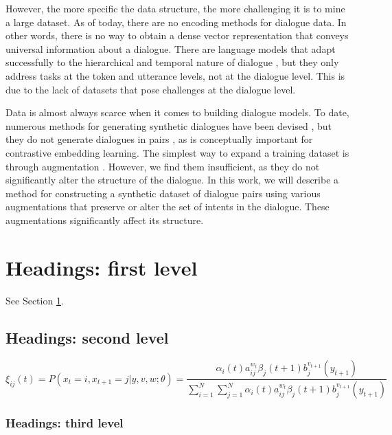 \documentclass{article}
\begin{document}
However, the more specific the data structure, the more challenging it is to mine a large dataset. As of today, there are no encoding methods for dialogue data. In other words, there is no way to obtain a dense vector representation that conveys universal information about a dialogue. There are language models that adapt successfully to the hierarchical and temporal nature of dialogue \cite{zhang-etal-2023-dialog, li2022future}, but they only address tasks at the token and utterance levels, not at the dialogue level. This is due to the lack of datasets that pose challenges at the dialogue level.

Data is almost always scarce when it comes to building dialogue models. To date, numerous methods for generating synthetic dialogues have been devised \cite{kim2021neuralwoz, mohapatra2021simulated, wan-etal-2022-unified, zheng2023augesc}, but they do not generate dialogues in pairs \cite{schick2021generating}, as is conceptually important for contrastive embedding learning. The simplest way to expand a training dataset is through augmentation \cite{soudani2023data}. However, we find them insufficient, as they do not significantly alter the structure of the dialogue. In this work, we will describe a method for constructing a synthetic dataset of dialogue pairs using various augmentations that preserve or alter the set of intents in the dialogue. These augmentations significantly affect its structure.


\section{Headings: first level}
\label{sec:headings}

\lipsum[4] See Section \ref{sec:headings}.

\subsection{Headings: second level}
\lipsum[5]
\begin{equation}
\xi _{ij}(t)=P(x_{t}=i,x_{t+1}=j|y,v,w;\theta)= {\frac {\alpha _{i}(t)a^{w_t}_{ij}\beta _{j}(t+1)b^{v_{t+1}}_{j}(y_{t+1})}{\sum _{i=1}^{N} \sum _{j=1}^{N} \alpha _{i}(t)a^{w_t}_{ij}\beta _{j}(t+1)b^{v_{t+1}}_{j}(y_{t+1})}}
\end{equation}

\subsubsection{Headings: third level}
\lipsum[6]
\end{document}
